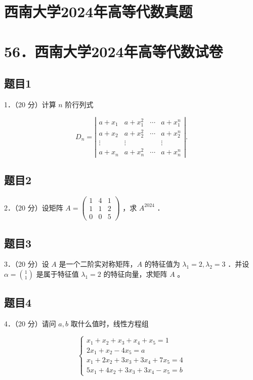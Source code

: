 \documentclass{article}
\begin{document}
\section*{西南大学2024年高等代数真题}
\section*{56．西南大学2024年高等代数试卷}

\subsection{题目1}
1．（20 分）计算 \(n\) 阶行列式

\[
D_{n}=\left|\begin{array}{cccc}
a+x_{1} & a+x_{1}^{2} & \cdots & a+x_{1}^{n} \\
a+x_{2} & a+x_{2}^{2} & \cdots & a+x_{2}^{n} \\
\vdots & \vdots & & \vdots \\
a+x_{n} & a+x_{n}^{2} & \cdots & a+x_{n}^{n}
\end{array}\right| .
\]

\subsection{题目2}
2．（20 分）设矩阵 \(A=\left(\begin{array}{lll}1 & 4 & 1 \\ 1 & 1 & 2 \\ 0 & 0 & 5\end{array}\right)\) ，求 \(A^{2024}\) ．

\subsection{题目3}
3．（20 分）设 \(A\) 是一个二阶实对称矩阵，\(A\) 的特征值为 \(\lambda_{1}=2, \lambda_{2}=3\) ．并设 \(\alpha=\binom{1}{1}\) 是属于特征值 \(\lambda_{1}=2\) 的特征向量，求矩阵 \(A\) 。

\subsection{题目4}
4．（20 分）请问 \(a, b\) 取什么值时，线性方程组

\[
\left\{\begin{array}{l}
x_{1}+x_{2}+x_{3}+x_{4}+x_{5}=1 \\
2 x_{1}+x_{2}-4 x_{5}=a \\
x_{1}+2 x_{2}+3 x_{3}+3 x_{4}+7 x_{5}=4 \\
5 x_{1}+4 x_{2}+3 x_{3}+3 x_{4}-x_{5}=b
\end{array}\right.
\]
\end{document}
